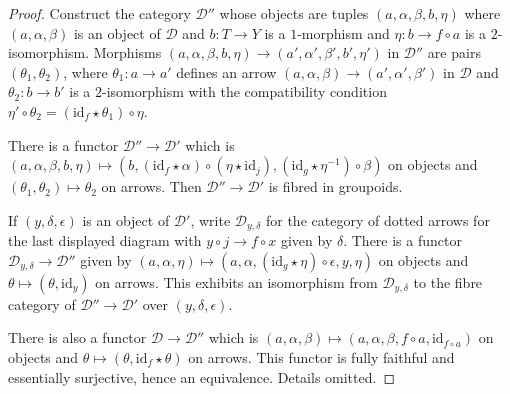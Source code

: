 \begin{proof}
Construct the category $\mathcal{D}''$ whose objects are tuples
$(a,\alpha,\beta,b,\eta)$ 
where $(a,\alpha,\beta)$ is an object of $\mathcal{D}$ and 
$b \colon T \rightarrow Y$ is a $1$-morphism
and $\eta \colon b \rightarrow f \circ a$ is a $2$-isomorphism. 
Morphisms $(a,\alpha,\beta,b,\eta) \rightarrow (a',\alpha',\beta',b',\eta')$
in $\mathcal{D}''$ 
are pairs $(\theta_1,\theta_2)$, where $\theta_1 \colon a \rightarrow a'$ 
defines an arrow $(a, \alpha, \beta) \rightarrow (a', \alpha', \beta')$ 
in $\mathcal{D}$ and $\theta_2 \colon b \rightarrow b'$ is a $2$-isomorphism 
with the compatibility condition 
$\eta' \circ \theta_2 = (\text{id}_f \star \theta_1) \circ \eta$.

\medskip\noindent
There is a functor $\mathcal{D}'' \rightarrow \mathcal{D}'$ which is
$(a, \alpha, \beta, b, \eta) \mapsto
(b, (\text{id}_f \star \alpha) \circ (\eta \star \text{id}_j),
(\text{id}_g \star \eta^{-1}) \circ \beta)$
on objects and $(\theta_1,\theta_2) \mapsto \theta_2$ on arrows. 
Then $\mathcal{D}'' \rightarrow \mathcal{D}'$ is fibred in groupoids. 

\medskip\noindent
If $(y, \delta, \epsilon)$ is an object of $\mathcal{D}'$, write
$\mathcal{D}_{y,\delta}$ 
for the category of dotted arrows for the last displayed diagram with 
$y \circ j \rightarrow f \circ x$ given by $\delta$.
There is a functor $\mathcal{D}_{y,\delta} \rightarrow \mathcal{D}''$ given by
$(a, \alpha, \eta) \mapsto
(a, \alpha, (\text{id}_g \star \eta) \circ \epsilon, y, \eta)$
on objects and $\theta \mapsto (\theta, \text{id}_y)$ on arrows. 
This exhibits an isomorphism from $\mathcal{D}_{y,\delta}$ to
the fibre category of $\mathcal{D}'' \rightarrow \mathcal{D}'$ over
$(y,\delta,\epsilon)$.

\medskip\noindent
There is also a functor $\mathcal{D} \rightarrow \mathcal{D}''$ which is 
$(a,\alpha,\beta) \mapsto (a,\alpha,\beta,f \circ a, \text{id}_{f \circ a})$ 
on objects and $\theta \mapsto (\theta, \text{id}_f \star \theta)$ on arrows. 
This functor is fully faithful and essentially surjective, hence an
equivalence. Details omitted.
\end{proof}














